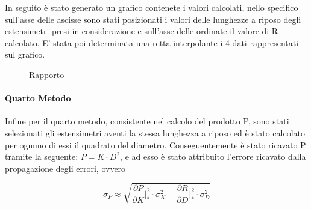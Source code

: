 \documentclass[a4paper,11pt,oneside]{article}
\begin{document}
In seguito è stato generato un grafico contenete i valori calcolati, nello specifico sull'asse delle ascisse sono stati posizionati i valori delle lunghezze a riposo degli estensimetri presi in considerazione e sull'asse delle ordinate il valore di R calcolato. E' stata poi determinata una retta interpolante i 4 dati rappresentati sul grafico.


\begin{figure}[h!]
    \centering
        \label{fig:rapporto}
        \caption{Rapporto}
\end{figure}

\paragraph{Quarto Metodo}
Infine per il quarto metodo, consistente nel calcolo del prodotto P, sono stati selezionati gli estensimetri aventi la stessa lunghezza a riposo ed è stato calcolato per ognuno di essi il quadrato del diametro. Conseguentemente è stato ricavato P tramite la seguente: $P= K \cdot D^2 $, e ad esso è stato attribuito l'errore ricavato dalla propagazione degli errori, ovvero 

\begin{equation*}
    \sigma_P \approx \sqrt{\frac{\partial P }{\partial K} \Big|_{\ast}^2 \cdot 
    \sigma_K^2 +  \frac{\partial R }{\partial D}\Big|_{\ast}^2 \cdot \sigma_D^2 }
\end{equation*}
\end{document}
